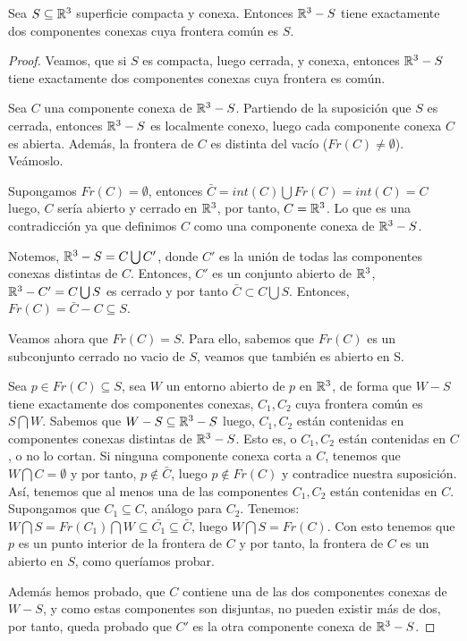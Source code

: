 \begin{theorem}
Sea $S \subseteq \mathbb{R}^3$ superficie compacta y conexa. Entonces $\mathbb{R}^3 - S$ tiene exactamente dos componentes conexas cuya frontera común es $S$.
\end{theorem}
\begin{proof}
Veamos, que si $S$ es compacta, luego cerrada, y conexa, entonces $\mathbb{R}^3 - S$ tiene exactamente dos componentes conexas cuya frontera es común.

Sea $C$ una componente conexa de $\mathbb{R}^3 - S$. Partiendo de la suposición que $S$ es cerrada, entonces $\mathbb{R}^3 - S$ es localmente conexo, luego cada componente conexa $C$ es abierta. Además, la frontera de $C$ es distinta del vacío ($Fr(C) \neq \emptyset$). Veámoslo.

Supongamos $Fr(C) = \emptyset$, entonces $\bar{C} = int(C)\bigcup Fr(C)=int(C)=C$ luego, $C$ sería abierto y cerrado en $\mathbb{R}^3$, por tanto, $C=\mathbb{R}^3$. Lo que es una contradicción ya que definimos $C$ como una componente conexa de $\mathbb{R}^3 - S$.

Notemos, $\mathbb{R}^3 - S = C \bigcup C'$, donde $C'$ es la unión de todas las componentes conexas distintas de $C$. Entonces, $C'$ es un conjunto abierto de $\mathbb{R}^3$, $\mathbb{R}^3 - C' = C \bigcup S$ es cerrado y por tanto $\bar{C} \subset C\bigcup S$. Entonces, $Fr(C)=\bar{C}-C \subseteq S$.


Veamos ahora que $Fr(C) = S$. Para ello, sabemos que $Fr(C)$ es un subconjunto cerrado no vacio de $S$, veamos que también es abierto en S.

Sea $p \in Fr(C) \subseteq S$, sea $W$ un entorno abierto de $p$ en $\mathbb{R}^3$, de forma que $W-S$ tiene exactamente dos componentes conexas, $C_1, C_2$ cuya frontera común es $S \bigcap W$. Sabemos que $W-S \subseteq \mathbb{R}^3 - S$ luego, $C_1, C_2$ están contenidas en componentes conexas distintas de $\mathbb{R}^3 - S$. Esto es, o $C_1, C_2$ están contenidas en $C$, o no lo cortan. Si ninguna componente conexa corta a $C$, tenemos que $W\bigcap C = \emptyset$ y por tanto, $p \notin \bar{C}$, luego $p \notin Fr(C)$ y contradice nuestra suposición. Así, tenemos que al menos una de las componentes $C_1, C_2$ están contenidas en $C$. Supongamos que $C_1 \subseteq C$, análogo para $C_2$. Tenemos: $W \bigcap S = Fr(C_1) \bigcap W \subseteq \bar{C_1} \subseteq \bar{C}$, luego $W \bigcap S= Fr(C)$. Con esto tenemos que $p$ es un punto interior de la frontera de $C$ y por tanto, la frontera de $C$ es un abierto en $S$, como queríamos probar.

Además hemos probado, que $C$ contiene una de las dos componentes conexas de $W-S$, y como estas componentes son disjuntas, no pueden existir más de dos, por tanto, queda probado que $C'$ es la otra componente conexa de $\mathbb{R}^3 - S$.

\end{proof}


